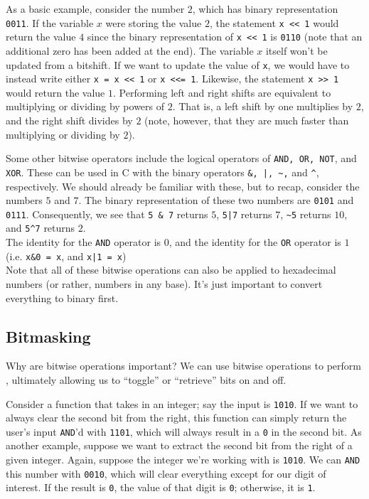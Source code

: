 As a basic example, consider the number $2$, which has binary representation \verb!0011!. If the variable $x$ were storing the value $2$, the statement \verb!x << 1! would return the value $4$ since the binary representation of \verb!x << 1! is \verb!0110! (note that an additional zero has been added at the end). The variable $x$ itself won't be updated from a bitshift. If we want to update the value of \verb!x!, we would have to instead write either \verb!x = x << 1! or \verb!x <<= 1!. Likewise, the statement \verb!x >> 1! would return the value $1$. Performing left and right shifts are equivalent to multiplying or dividing by powers of $2$. That is, a left shift by one multiplies by $2$, and the right shift divides by $2$ (note, however, that they are much faster than multiplying or dividing by $2$).



Some other bitwise operators include the logical operators of \verb!AND, OR, NOT!, and \verb!XOR!. These can be used in C with the binary operators \verb!&, |, ~,! and \verb!^!, respectively. We should already be familiar with these, but to recap, consider the numbers $5$ and $7$. The binary representation of these two numbers are \verb!0101! and \verb!0111!. Consequently, we see that \verb!5 & 7! returns $5$, \verb!5|7! returns $7$, \verb!~5! returns $10$, and \verb!5^7! returns $2$. \\

The identity for the \verb!AND! operator is $0$, and the identity for the \verb!OR! operator is $1$ (i.e. \verb!x&0 = x!, and \verb!x|1 = x!) \\


Note that all of these bitwise operations can also be applied to hexadecimal numbers (or rather, numbers in any base). It's just important to convert everything to binary first.  \\


\subsection{Bitmasking}

Why are bitwise operations important? We can use bitwise operations to perform , ultimately allowing us to ``toggle'' or ``retrieve'' bits on and off. 


Consider a function that takes in an integer; say the input is \verb!1010!. If we want to always clear the second bit from the right, this function can simply return the user's input \verb!AND!'d with \verb!1101!, which will always result in a \verb!0! in the second bit. 
As another example, suppose we want to extract the second bit from the right of a given integer. Again, suppose the integer we're working with is \verb!1010!. We can \verb!AND! this number with \verb!0010!, which will clear everything except for our digit of interest. If the result is \verb!0!, the value of that digit is \verb!0!; otherwise, it is \verb!1!. 

